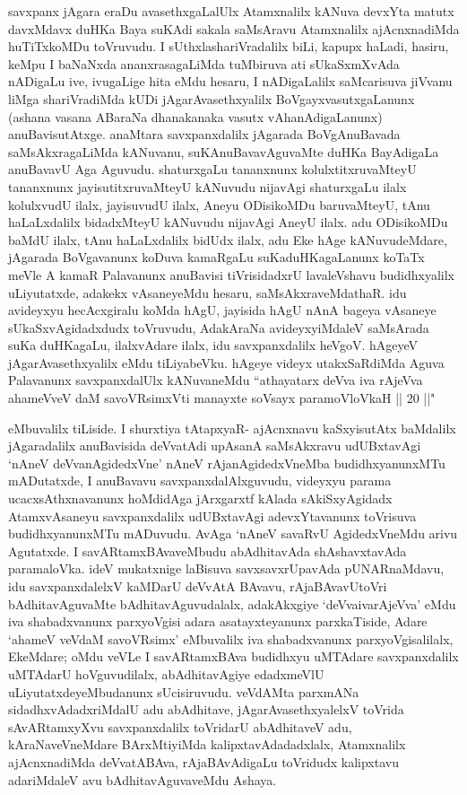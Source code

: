 \begin{artha}
savxpanx jAgara eraDu avasethxgaLalUlx Atamxnalilx kANuva devxYta matutx davxMdavx duHKa Baya suKAdi sakala saMsAravu Atamxnalilx ajAcnxnadiMda huTiTxkoMDu toVruvudu. I sUthxlashariVradalilx biLi, kapupx haLadi, hasiru, keMpu I baNaNxda ananxrasagaLiMda tuMbiruva ati sUkaSxmXvAda nADigaLu ive, ivugaLige hita eMdu hesaru, I nADigaLalilx saMcarisuva jiVvanu liMga shariVradiMda kUDi jAgarAvasethxyalilx BoVgayxvasutxgaLanunx (ashana vasana ABaraNa dhanakanaka vasutx vAhanAdigaLanunx) anuBavisutAtxge. anaMtara savxpanxdalilx jAgarada BoVgAnuBavada saMsAkxragaLiMda kANuvanu, suKAnuBavavAguvaMte duHKa BayAdigaLa anuBavavU Aga Aguvudu. shaturxgaLu tananxnunx kolulxtitxruvaMteyU tananxnunx jayisutitxruvaMteyU kANuvudu nijavAgi shaturxgaLu ilalx kolulxvudU ilalx, jayisuvudU ilalx, Aneyu ODisikoMDu baruvaMteyU, tAnu haLaLxdalilx bidadxMteyU kANuvudu nijavAgi AneyU ilalx. adu ODisikoMDu baMdU ilalx, tAnu haLaLxdalilx bidUdx ilalx, adu Eke hAge kANuvudeMdare, jAgarada BoVgavanunx koDuva kamaRgaLu suKaduHKagaLanunx koTaTx meVle A kamaR Palavanunx anuBavisi tiVrisidadxrU lavaleVshavu budidhxyalilx uLiyutatxde, adakekx vAsaneyeMdu hesaru, saMsAkxraveMdathaR. idu avideyxyu hecAcxgiralu koMda hAgU, jayisida hAgU nAnA bageya vAsaneye sUkaSxvAgidadxdudx toVruvudu, AdakAraNa avideyxyiMdaleV saMsArada suKa duHKagaLu, ilalxvAdare ilalx, idu savxpanxdalilx heVgoV. hAgeyeV jAgarAvasethxyalilx eMdu tiLiyabeVku. hAgeye videyx utakxSaRdiMda Aguva Palavanunx savxpanxdalUlx kANuvaneMdu ``athayatarx deVva iva rAjeVva ahameVveV daM savoVR\s simxVti manayxte soV\s sayx paramoVloVkaH || 20 ||" 
\end{artha}%

\begin{artha}
eMbuvalilx tiLiside. I shurxtiya tAtapxyaR- ajAcnxnavu kaSxyisutAtx baMdalilx jAgaradalilx anuBavisida deVvatAdi upAsanA saMsAkxravu udUBxtavAgi `nAneV deVvanAgidedxVne' nAneV rAjanAgidedxVneMba budidhxyanunxMTu mADutatxde, I anuBavavu savxpanxdalAlxguvudu, videyxyu parama ucacxsAthxnavanunx hoMdidAga jArxgarxtf kAlada sAkiSxyAgidadx AtamxvAsaneyu savxpanxdalilx udUBxtavAgi adevxYtavanunx toVrisuva budidhxyanunxMTu mADuvudu. AvAga `nAneV savaRvU AgidedxVneMdu arivu Agutatxde. I savARtamxBAvaveMbudu abAdhitavAda shAshavxtavAda paramaloVka. ideV mukatxnige laBisuva savxsavxrUpavAda pUNARnaMdavu, idu savxpanxdalelxV kaMDarU deVvAtA BAvavu, rAjaBAvavUtoVri bAdhitavAguvaMte bAdhitavAguvudalalx, adakAkxgiye `deVvaivarAjeVva' eMdu iva shabadxvanunx parxyoVgisi adara asatayxteyanunx parxkaTiside, Adare `ahameV veVdaM savoVRsimx' eMbuvalilx iva shabadxvanunx parxyoVgisalilalx, EkeMdare; oMdu veVLe I savARtamxBAva budidhxyu uMTAdare savxpanxdalilx uMTAdarU hoVguvudilalx, abAdhitavAgiye edadxmeVlU uLiyutatxdeyeMbudanunx sUcisiruvudu. veVdAMta parxmANa sidadhxvAdadxriMdalU adu abAdhitave, jAgarAvasethxyalelxV toVrida sAvARtamxyXvu savxpanxdalilx toVridarU abAdhitaveV adu, kAraNaveVneMdare BArxMtiyiMda kalipxtavAdadadxlalx, Atamxnalilx ajAcnxnadiMda deVvatABAva, rAjaBAvAdigaLu toVridudx kalipxtavu adariMdaleV avu bAdhitavAguvaveMdu Ashaya. 
\end{artha}

